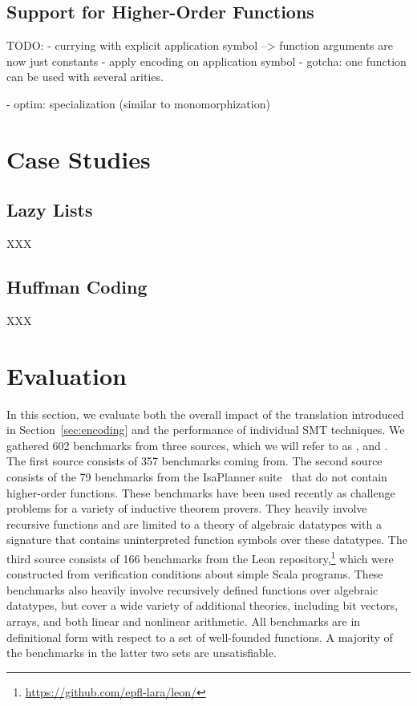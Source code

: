 \subsection{Support for Higher-Order Functions}

TODO:
- currying with explicit application symbol --> function arguments are now
  just constants
- apply encoding on application symbol
- gotcha: one function can be used with several arities.

- optim: specialization (similar to monomorphization)

\section{Case Studies}
\label{sec:case-studies}

\subsection{Lazy Lists}

XXX

\subsection{Huffman Coding}

XXX

\section{Evaluation}
\label{sec:evaluation}

{
In this section, we evaluate both the overall impact of the translation
introduced in Section~\ref{sec:encoding} and the performance of individual SMT
techniques.
%
We gathered 602 benchmarks from three sources, which we will refer to as
\isanun, \isa and \leon. 
The first source consists of 357 benchmarks coming from.
The second source consists of the 79
benchmarks from the IsaPlanner
suite~\cite{DBLP:conf/itp/JohanssonDB10} that do not contain higher-order
functions. These benchmarks have been used recently as challenge problems for a
variety of inductive theorem provers. They heavily involve
recursive functions and are limited to a theory of algebraic datatypes
with a signature that contains uninterpreted function symbols over these datatypes. 
The third source consists of 166
benchmarks from the Leon repository,\footnote{%
\url{https://github.com/epfl-lara/leon/}} which were constructed from
verification conditions about simple Scala programs. These benchmarks also
heavily involve recursively defined functions over algebraic datatypes, 
but cover a wide variety of additional theories, including bit vectors, arrays, and
both linear and nonlinear arithmetic. All benchmarks are in definitional form
with respect to a set of well-founded functions.
A majority of the benchmarks in the latter two sets are unsatisfiable.
}

